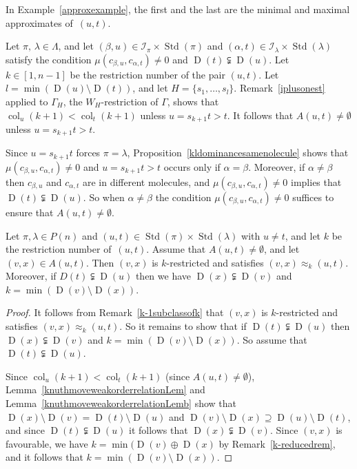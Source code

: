 \documentclass[ALCO,ThmDefs,Unicode,epreuves]{cedram}
\DeclareMathOperator{\col}{col}
\DeclareMathOperator{\STD}{Std}
\DeclareMathOperator{\D}{D}
\begin{document}
In Example~\ref{approxexample}, the first and the last are the minimal and maximal approximates of~$(u,t)$.

\begin{rema}\label{nonemptyAkst}
Let $\pi,\,\lambda\in\Lambda$, and
let $(\beta,u)\in\mathcal{I}_{\pi}\times\STD(\pi)$ and
$(\alpha,t)\in\mathcal{I}_{\lambda}\times\STD(\lambda)$ satisfy the condition
$\mu(c_{\beta,u},c_{\alpha,t}) \neq 0$ and $\D(t) \subsetneqq \D(u)$.
Let $k\in[1,n-1]$ be the restriction number of the pair
$(u,t)$. Let $l=\min(\D(u)\setminus\D(t))$, and let
$H=\{s_1,\ldots,s_l\}$. Remark~\ref{iplusonest} applied to $\Gamma_H$,
the $W_H$-restriction of $\Gamma$, shows that $\col_u(k+1)<\col_t(k+1)$
unless $u=s_{k+1}t>t$. It follows that $A(u,t)\ne\emptyset$
unless $u=s_{k+1}t>t$.

Since $u=s_{k+1}t$ forces $\pi=\lambda$, Proposition~\ref{kldominancesamenolecule}
shows that $\mu(c_{\beta,u},c_{\alpha,t}) \neq 0$ and $u=s_{k+1}t>t$ occurs only
if $\alpha=\beta$. Moreover, if $\alpha\neq\beta$ then
$c_{\beta,u}$ and $c_{\alpha,t}$ are in different molecules, and
$\mu(c_{\beta,u},c_{\alpha,t})\neq 0$ implies that $\D(t) \subsetneqq \D(u)$.
So when $\alpha\neq\beta$ the condition $\mu(c_{\beta,u},c_{\alpha,t})\neq 0$
suffices to ensure that $A(u,t)\neq\emptyset$.
\end{rema}

\begin{lemm}\label{k-minimallemma1}
Let $\pi,\lambda\in P(n)$ and $(u,t)\in\STD(\pi)\times\STD(\lambda)$
with $u\neq t$, and let $k$ be the restriction number of~$(u,t)$.
Assume that $A(u,t)\neq\emptyset$, and let
$(v,x)\in A(u,t)$. Then $(v,x)$ is $k$-restricted and satisfies
$(v,x)\approx_k(u,t)$.
Moreover, if $D(t)\subsetneqq\D(u)$ then we have
$\D(x)\subsetneqq\D(v)$ and $k=\min(\D(v)\setminus\D(x))$.
\end{lemm}

\begin{proof}
It follows from Remark~\ref{k-1subclassofk} that $(v,x)$ is $k$-restricted and
satisfies $(v,x)\approx_k(u,t)$. So it remains to show that if $\D(t)\subsetneqq\D(u)$
then $\D(x)\subsetneqq\D(v)$ and $k=\min(\D(v)\setminus\D(x))$. So assume that
$\D(t)\subsetneqq\D(u)$.

Since $\col_u(k+1)<\col_t(k+1)$
(since $A(u,t)\neq\emptyset$), Lemma~\ref{knuthmoveweakorderrelationLem}
and Lemma~\ref{knuthmoveweakorderrelationLemb} show that
$\D(x)\setminus\D(v)=\D(t)\setminus\D(u)$ and
$\D(v)\setminus\D(x)\supseteq\D(u)\setminus\D(t)$, and since
$\D(t)\subsetneqq\D(u)$ it follows that $\D(x)\subsetneqq\D(v)$.
Since $(v,x)$ is favourable, we have $k=\min(\D(v)\oplus\D(x)$
by Remark~\ref{k-reducedrem}, and it follows that $k=\min(\D(v)\setminus\D(x))$.
\end{proof}
\end{document}
